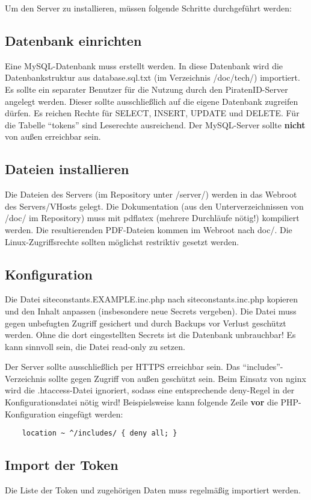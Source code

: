Um den Server zu installieren, müssen folgende Schritte durchgeführt werden:

\subsection{Datenbank einrichten}
Eine MySQL-Datenbank muss erstellt werden.
In diese Datenbank wird die Datenbankstruktur aus database.sql.txt (im Verzeichnis /doc/tech/) importiert.
Es sollte ein separater Benutzer für die Nutzung durch den PiratenID-Server angelegt werden.
Dieser sollte ausschließlich auf die eigene Datenbank zugreifen dürfen.
Es reichen Rechte für SELECT, INSERT, UPDATE und DELETE. Für die Tabelle "`tokens"' sind Leserechte ausreichend.
Der MySQL-Server sollte \textbf{nicht} von außen erreichbar sein.

\subsection{Dateien installieren}
Die Dateien des Servers (im Repository unter /server/) werden in das Webroot des Servers/VHosts gelegt.
Die Dokumentation (aus den Unterverzeichnissen von /doc/ im Repository) muss mit pdflatex (mehrere Durchläufe nötig!) kompiliert werden.
Die resultierenden PDF-Dateien kommen im Webroot nach doc/.
Die Linux-Zugriffsrechte sollten möglichst restriktiv gesetzt werden.

\subsection{Konfiguration}
Die Datei siteconstants.EXAMPLE.inc.php nach siteconstants.inc.php kopieren und den Inhalt anpassen (insbesondere neue Secrets vergeben).
Die Datei muss gegen unbefugten Zugriff gesichert und durch Backups vor Verlust geschützt werden. Ohne die dort eingestellten Secrets ist die Datenbank unbrauchbar!
Es kann sinnvoll sein, die Datei read-only zu setzen.

Der Server sollte ausschließlich per HTTPS erreichbar sein.
Das "`includes"'-Verzeichnis sollte gegen Zugriff von außen geschützt sein.
Beim Einsatz von nginx wird die .htaccess-Datei ignoriert, sodass eine entsprechende deny-Regel in der Konfigurationsdatei nötig wird!
Beispielsweise kann folgende Zeile \textbf{vor} die PHP-Konfiguration eingefügt werden:
\begin{verbatim}
    location ~ ^/includes/ { deny all; }
\end{verbatim}


\subsection{Import der Token}
Die Liste der Token und zugehörigen Daten muss regelmäßig importiert werden.

